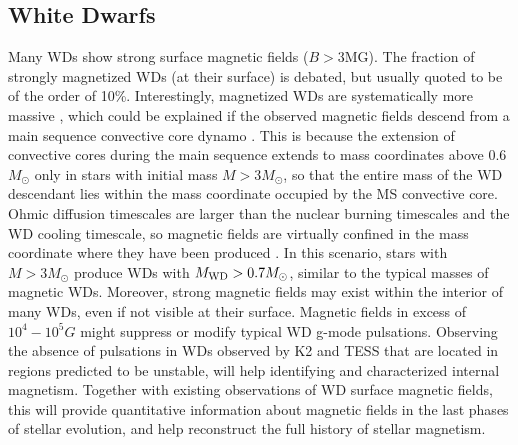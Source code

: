 {\color{red} \subsection{White Dwarfs}}
Many WDs show strong surface magnetic fields ($B>$3MG). The fraction of strongly magnetized WDs (at their surface) is debated, but usually quoted to be of the order of 10\%. Interestingly, magnetized WDs are systematically more massive \cite{Ferrario_2015}, which could be explained if the observed magnetic fields descend from a main sequence convective core dynamo \cite{Cantiello_2016}. This is because the extension of convective cores during the main sequence extends to mass coordinates above 0.6$M_\odot$ only in stars with initial mass $M>3M_\odot$, so that the entire mass of the WD descendant lies within the mass coordinate occupied by the MS convective core. Ohmic diffusion timescales are larger than the nuclear burning timescales and the WD cooling timescale, so magnetic fields are virtually confined in the mass coordinate where they have been produced \cite{Cantiello_2016}. In this scenario, stars with $M>3M_\odot$ produce WDs with $M_{\rm WD}>0.7M_\odot$, similar to the typical masses of magnetic WDs. Moreover, strong magnetic fields may exist within the interior of many WDs, even if not visible at their surface. Magnetic fields in excess of $10^4-10^5 G$ might suppress or modify typical WD g-mode pulsations. Observing the absence of pulsations in WDs observed by K2 and TESS that are located in regions predicted to be unstable, will help identifying and characterized internal magnetism. Together with existing observations of WD surface magnetic fields, this will provide quantitative information about magnetic fields in the last phases of stellar evolution, and help reconstruct the full history of stellar magnetism.

